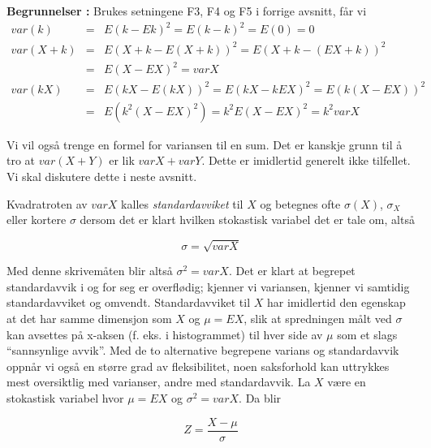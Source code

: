\begin{center}  \end{center}
{\bf Begrunnelser :} Brukes setningene F3, F4 og F5 i forrige avsnitt, får vi
\begin{eqnarray*}
var (k)&=&E{(k-Ek)}^2=E{(k-k)}^2=E(0)=0 \\
var(X+k)&=&E{(X+k-E(X+k))}^2=E{(X+k-(EX+k))}^2 \\
        &=&E{(X-EX)}^2= varX \\
var(kX)&=&E{(kX-E(kX))}^2=E{(kX-kEX)}^2=E{(k(X-EX))}^2 \\
       &=&E(k^2{(X-EX)}^2)=k^2E{(X-EX)}^2=k^2 varX
\end{eqnarray*}

Vi vil også trenge en formel for variansen til en sum. Det er
kanskje grunn til å tro at $var(X+Y)$ er lik $var X+var Y$. Dette
er imidlertid generelt ikke tilfellet. Vi skal diskutere dette i
neste avsnitt.

Kvadratroten av $var X$ kalles {\em standardavviket} til $X$ og
betegnes ofte $\sigma (X)$, $\sigma_X$ eller kortere $\sigma$
dersom det er klart hvilken stokastisk variabel det er tale om,
altså

\[     \sigma=\sqrt{varX}  \]

\noindent Med denne skrivemåten blir altså ${\sigma}^2=varX$.
Det er klart
at begrepet standardavvik i og for seg er overflødig; kjenner vi
variansen, kjenner vi samtidig standardavviket og omvendt.
Standardavviket til $X$ har imidlertid den egenskap at det har
samme dimensjon som $X$ og $\mu =EX$, slik at spredningen målt
ved $\sigma$ kan avsettes på x-aksen (f. eks. i histogrammet) til
hver side av $\mu$ som et slags ``sannsynlige avvik''. 
Med de to alternative begrepene
varians og standardavvik oppnår vi også en større grad av
fleksibilitet, noen saksforhold kan uttrykkes mest oversiktlig
med varianser, andre med standardavvik.
La $X$ være en stokastisk variabel hvor $\mu =EX$ og
$\sigma^2=var X$. Da blir

\[ Z=\frac{X-\mu}{\sigma}  \]


